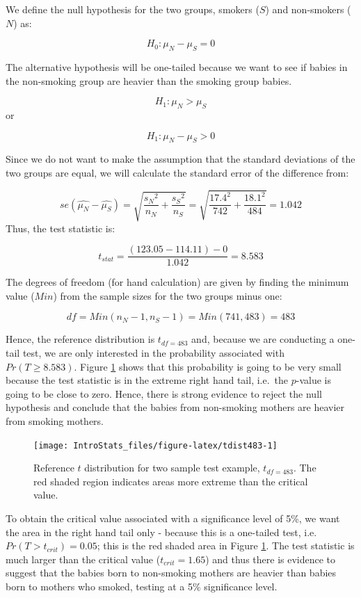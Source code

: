 \documentclass[
  oneside]{krantz}
\begin{document}
We define the null hypothesis for the two groups, smokers (\(S\)) and non-smokers (\(N\)) as:

\[H_0: \mu_N - \mu_S = 0\]

The alternative hypothesis will be one-tailed because we want to see if babies in the non-smoking group are heavier than the smoking group babies.

\[H_1: \mu_N > \mu_S\]
or

\[H_1: \mu_N - \mu_S > 0\]

Since we do not want to make the assumption that the standard deviations of the two groups are equal, we will calculate the standard error of the difference from:

\[se(\hat{\mu_N} - \hat{\mu_S})= \sqrt{\frac{{s_N}^2}{{n_N}} + \frac{{s_S}^2}{{n_S}}} = \sqrt{\frac{17.4^2}{742} + \frac{18.1^2}{484}} = 1.042\]
Thus, the test statistic is:

\[t_{stat} = \frac{(123.05 - 114.11) - 0}{1.042} = 8.583\]

The degrees of freedom (for hand calculation) are given by finding the minimum value (\(Min\)) from the sample sizes for the two groups minus one:

\[df = Min(n_N-1, n_S-1) = Min(741, 483) = 483\]

Hence, the reference distribution is \(t_{df=483}\) and, because we are conducting a one-tail test, we are only interested in the probability associated with \(Pr(T \ge 8.583)\). Figure \ref{fig:tdist483} shows that this probability is going to be very small because the test statistic is in the extreme right hand tail, i.e.~the \(p\)-value is going to be close to zero. Hence, there is strong evidence to reject the null hypothesis and conclude that the babies from non-smoking mothers are heavier from smoking mothers.

\begin{figure}[!htb]

{\centering \texttt{[image: IntroStats\_files/figure-latex/tdist483-1]} 

}

\caption{Reference $t$ distribution for two sample test example, $t_{df=483}$. The red shaded region indicates areas more extreme than the critical value.}\label{fig:tdist483}
\end{figure}

To obtain the critical value associated with a significance level of 5\%, we want the area in the right hand tail only - because this is a one-tailed test, i.e.~\(Pr(T > t_{crit}) = 0.05\); this is the red shaded area in Figure \ref{fig:tdist483}. The test statistic is much larger than the critical value (\(t_{crit}=1.65\)) and thus there is evidence to suggest that the babies born to non-smoking mothers are heavier than babies born to mothers who smoked, testing at a 5\% significance level.
\end{document}
